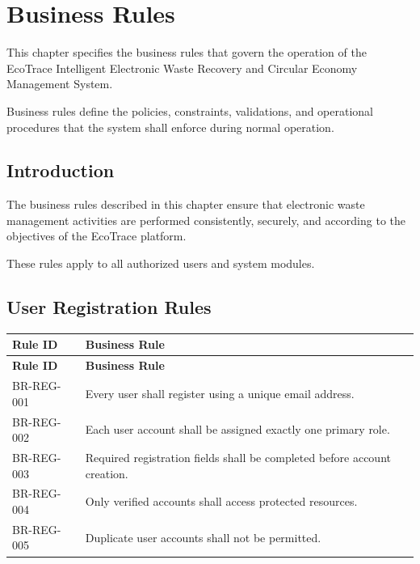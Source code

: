 \chapter{Business Rules}
\label{chap:business-rules}

This chapter specifies the business rules that govern the operation of
the EcoTrace Intelligent Electronic Waste Recovery and Circular Economy
Management System.

Business rules define the policies, constraints, validations, and
operational procedures that the system shall enforce during normal
operation.


\section{Introduction}
\label{sec:business-rules-introduction}

The business rules described in this chapter ensure that electronic
waste management activities are performed consistently, securely, and
according to the objectives of the EcoTrace platform.

These rules apply to all authorized users and system modules.

\section{User Registration Rules}
\label{sec:user-registration-rules}

\begin{longtable}{|p{3cm}|p{10cm}|}

\hline
\textbf{Rule ID} &
\textbf{Business Rule}\\
\hline
\endfirsthead

\hline
\textbf{Rule ID} &
\textbf{Business Rule}\\
\hline
\endhead

BR-REG-001 &
Every user shall register using a unique email address.\\
\hline

BR-REG-002 &
Each user account shall be assigned exactly one primary role.\\
\hline

BR-REG-003 &
Required registration fields shall be completed before account creation.\\
\hline

BR-REG-004 &
Only verified accounts shall access protected resources.\\
\hline

BR-REG-005 &
Duplicate user accounts shall not be permitted.\\
\hline

\end{longtable}

